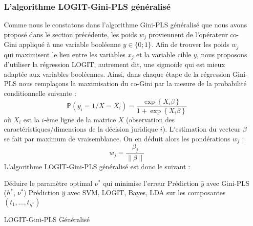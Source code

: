 \subsubsection{L'algorithme LOGIT-Gini-PLS généralisé} 
\label{sec:sensresultat:logit-gini-pls}
Comme nous le constatons dans l'algorithme Gini-PLS généralisé que nous avons proposé dans le section précédente, les poids $w_j$ proviennent de l'opérateur co-Gini appliqué à une variable booléenne $y \in \lbrace 0;1 \rbrace$. Afin de trouver les poids $w_j$ qui maximisent le lien entre les variables $x_j$ et la variable cible $y$, nous proposons d'utiliser la régression LOGIT, autrement dit, une sigmoïde qui est mieux adaptée aux variables booléennes. Ainsi, dans chaque étape de la régression Gini-PLS nous remplaçons la maximisation du co-Gini par la mesure de la probabilité conditionnelle suivante :
\begin{equation}\tag{LOGIT}
\mathbb{P}(y_i = 1 / X = X_i) = \frac{\exp\left\{X_i \beta \right\}}{1+\exp\left\{ X_i \beta \right\}}
\end{equation}
où $X_i$ est la $i$-ème ligne de la matrice $X$ (observation des caractéristiques/dimensions de la décision juridique $i$). L'estimation du vecteur $\beta$ se fait par maximum de vraisemblance. On en déduit alors les pondérations $w_j$ :
\[
w_j = \frac{\beta_j}{\| \beta\|}
\]
L'algorithme LOGIT-Gini-PLS généralisé est donc le suivant :

\begin{algorithm}[h]
	\small
	Déduire le paramètre optimal $\nu^*$ qui minimise l'erreur \; 
	\Return Prédiction $\hat{y}$ avec Gini-PLS ($h^*$, $\nu^*$) \;
	\Return Prédiction $\hat{y}$ avec SVM, LOGIT, Bayes, LDA sur les composantes $(t_1,\ldots,t_{h^*})$\;
	\caption{LOGIT-Gini-PLS Généralisé}\label{LG-GPLS}
\end{algorithm}

